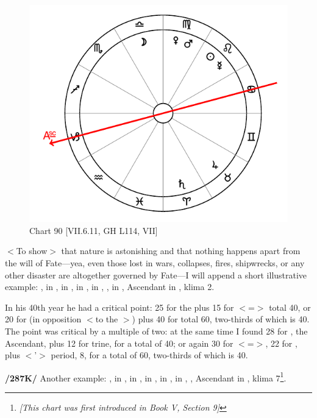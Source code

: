 \begin{figure}
\centering
\vspace{0pt}
\includegraphics[width=.68\textwidth]{charts/7_6_11}
\caption{Chart 90 [VII.6.11, GH L114, VII] }
\label{fig:chart90}
\end{figure} 

$<$To show$>$ that nature is astonishing and that nothing happens apart from the will of Fate—yea, even those lost in wars, collapses, fires, shipwrecks, or any other disaster are altogether governed by Fate—I will append a short illustrative example: \Sun, \Mercury\xspace in \Leo, \Moon\xspace in \Libra, \Saturn\xspace in \Aries, \Jupiter\xspace in \Taurus, \Mars, \Venus\xspace in \Virgo, Ascendant in \Capricorn, klima 2. 

In his 40th year he had a critical point: 25 for the \Moon\xspace plus 15 for \Aries\xspace $<$=\Mars$>$ total 40, or 20 for \Aries\xspace (in opposition $<$to the \Moon$>$) plus 40 for \Libra\xspace total 60, two-thirds of which is 40. The point was critical by a multiple of two: at the same time I found 28 for \Capricorn, the Ascendant, plus 12 for \Jupiter trine, for a total of 40; or again 30 for \Capricorn\xspace $<$=\Saturn$>$, 22 for \Taurus, plus $<$\Venus’$>$ period, 8, for a total of 60, two-thirds of which is 40.

\textbf{/287K/} Another example: \Sun, \Mercury\xspace in \Aquarius, \Moon\xspace in \Scorpio, \Saturn\xspace in \Cancer, \Jupiter\xspace in \Libra, \Venus\xspace in \Capricorn, \Mars, Ascendant in \Virgo, klima 7\footnote{\textit{[This chart was first introduced in Book V, Section 9]}}.

